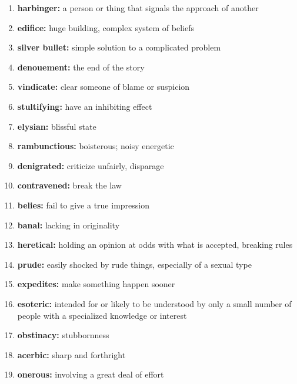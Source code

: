 \documentclass{article}
\begin{document}
\begin{enumerate}
    \item \textbf{harbinger: }{a person or thing that signals the approach of another}
    \item \textbf{edifice: }{huge building, complex system of beliefs}
    \item \textbf{silver bullet: }{simple solution to a complicated problem}
    \item \textbf{denouement: }{the end of the story}
    \item \textbf{vindicate: }{clear someone of blame or suspicion}
    \item \textbf{stultifying: }{have an inhibiting effect}
    \item \textbf{elysian: }{blissful state}
    \item \textbf{rambunctious: }{boisterous; noisy energetic}
    \item \textbf{denigrated: }{criticize unfairly, disparage}
    \item \textbf{contravened: }{break the law}
    \item \textbf{belies: }{fail to give a true impression}
    \item \textbf{banal: }{lacking in originality}
    \item \textbf{heretical: }{holding an opinion at odds with what is accepted, breaking rules}
    \item \textbf{prude: }{easily shocked by rude things, especially of a sexual type}
    \item \textbf{expedites: }{make something happen sooner}
    \item \textbf{esoteric: }{intended for or likely to be understood by only a small number of people with a specialized knowledge or interest}
    \item \textbf{obstinacy: }{stubbornness}
    \item \textbf{acerbic: }{sharp and forthright}
    \item \textbf{onerous: }{involving a great deal of effort}
    
\end{enumerate}
\end{document}
